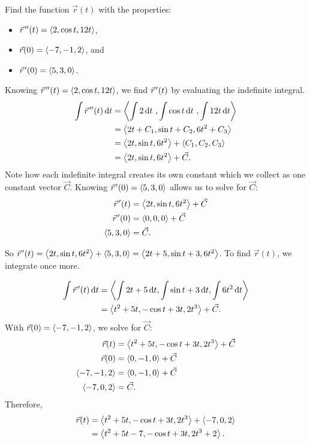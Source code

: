 \begin{example}\label{ex_vvfint2}%
Find the function $\vec r(t)$ with the properties:
\begin{itemize}
	\item $\vec r\hskip1.25pt ''(t) =\left\langle 2, \cos t, 12t\right\rangle$,
	\item $\vec r(0) =\left\langle -7,-1,2\right\rangle$, and
	\item	$\vec r\hskip1.25pt '(0) =\left\langle 5,3,0\right\rangle$.
\end{itemize}
\solution
Knowing $\vec r\hskip1.25pt ''(t) =\left\langle 2,\cos t, 12t\right\rangle$, we find $\vec r\hskip1.25pt '(t)$ by evaluating the indefinite integral.
\begin{align*}
\int \vec r\hskip1.25pt ''(t)\operatorname{d}\! t &=\left\langle \int 2\operatorname{d}\! t\ , \int \cos t\operatorname{d}\! t\ , \int 12t\operatorname{d}\! t\right\rangle\\
						&=\left\langle 2t+C_1, \sin t+ C_2, 6t^2 + C_3\right\rangle\\
						&=\left\langle 2t,\sin t,6t^2\right\rangle+\left\langle C_1,C_2,C_3\right\rangle\\
						&=\left\langle 2t,\sin t,6t^2\right\rangle+ \vec C.
\end{align*}
Note how each indefinite integral creates its own constant which we collect as one constant vector $\vec C$. Knowing $\vec r\hskip1.25pt '(0) =\left\langle 5,3,0\right\rangle$ allows us to solve for $\vec C$:
\begin{align*}
\vec r\hskip1.25pt '(t) & =\left\langle 2t,\sin t,6t^2\right\rangle+ \vec C\\
\vec r\hskip1.25pt '(0) &=\left\langle 0,0,0\right\rangle+ \vec C\\
\left\langle 5,3,0\right\rangle&= \vec C.
\end{align*}

So $\vec r\hskip1.25pt '(t) =\left\langle 2t,\sin t,6t^2\right\rangle+\left\langle 5,3,0\right\rangle=\left\langle 2t+5, \sin t + 3, 6t^2\right\rangle$. To find $\vec r(t)$, we integrate once more.

\begin{align*}
\int \vec r\hskip1.25pt '(t)\operatorname{d}\! t &=\left\langle \int 2t+5\operatorname{d}\! t, \int \sin t + 3\operatorname{d}\! t, \int 6t^2\operatorname{d}\! t\right\rangle\\
							&=\left\langle t^2+5t, -\cos t + 3t, 2t^3\right\rangle+ \vec C.
\end{align*}
With $\vec r(0) =\left\langle -7,-1,2\right\rangle$, we solve for $\vec C$:
\begin{align*}
\vec r(t) &=\left\langle t^2+5t, -\cos t + 3t, 2t^3\right\rangle+ \vec C\\
\vec r(0) &=\left\langle 0,-1,0\right\rangle+ \vec C\\
\left\langle -7,-1,2\right\rangle&=\left\langle 0,-1,0\right\rangle+ \vec C\\
\left\langle -7,0,2\right\rangle&= \vec C.
\end{align*}
Therefore,
\begin{align*}
 \vec r(t) &=\left\langle t^2+5t, -\cos t + 3t, 2t^3\right\rangle+\left\langle -7,0,2\right\rangle\\
 &=\left\langle t^2+5t-7,-\cos t+3t,2t^3+2\right\rangle.
\end{align*}
\end{example}

